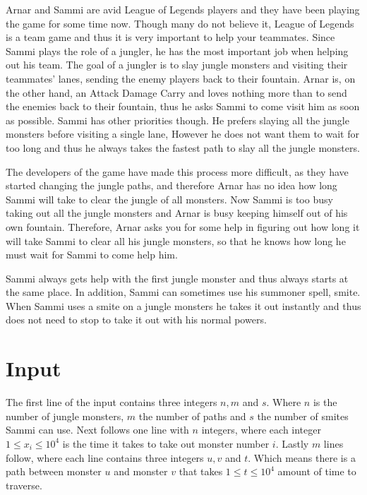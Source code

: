 
Arnar and Sammi are avid League of Legends players and they have been playing the game for some time now.
Though many do not believe it, League of Legends is a team game and thus it is very important to help your teammates.
Since Sammi plays the role of a jungler, he has the most important job when helping out his team.
The goal of a jungler is to slay jungle monsters and visiting their teammates' lanes, sending the enemy players back to their fountain.
Arnar is, on the other hand, an Attack Damage Carry and loves nothing more than to send the enemies back to their fountain, thus he asks Sammi to come visit him as soon as possible.
Sammi has other priorities though. He prefers slaying all the jungle monsters before visiting a single lane,
However he does not want them to wait for too long and thus he always takes the fastest path to slay all the jungle monsters.

The developers of the game have made this process more difficult, as they have started changing the jungle paths, and therefore Arnar has no idea how long Sammi will take to clear the jungle of all monsters.
Now Sammi is too busy taking out all the jungle monsters and Arnar is busy keeping himself out of his own fountain.
Therefore, Arnar asks you for some help in figuring out how long it will take Sammi to clear all his jungle monsters, so that he knows how long he must wait for Sammi to come help him.

Sammi always gets help with the first jungle monster and thus always starts at the same place.
In addition, Sammi can sometimes use his summoner spell, smite. When Sammi uses a smite on a jungle monsters he takes it out instantly and thus does not need to stop to take it out with his normal powers.

\section*{Input}
The first line of the input contains three integers $n, m$ and $s$. Where $n$ is the number of jungle monsters, $m$ the number of paths
and $s$ the number of smites Sammi can use.
Next follows one line with $n$ integers, where each integer $1 \leq x_i \leq 10^4$ is the time it takes to take out monster number $i$.
Lastly $m$ lines follow, where each line contains three integers $u, v$ and $t$. Which means there is a path between monster $u$ and monster $v$ that takes $1\leq t \leq 10^4$ amount of time to traverse.

